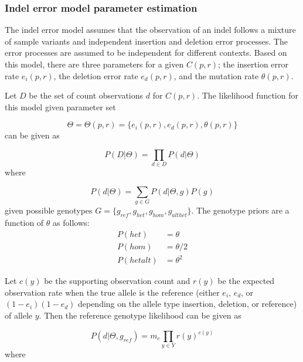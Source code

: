 \documentclass{article}
\begin{document}
\subsubsection{Indel error model parameter estimation}
The indel error model assumes that the observation of an indel follows a mixture of sample variants and independent insertion and deletion error processes. The error processes are assumed to be independent for different contexts. Based on this model, there are three parameters for a given $C(p,r)$; the insertion error rate $e_i(p,r)$, the deletion error rate $e_d(p,r)$, and the mutation rate $\theta(p,r)$.

Let $D$ be the set of count observations $d$ for $C(p,r)$. The likelihood function for this model given parameter set

\begin{equation*}
\Theta=\Theta(p,r)=\{e_i(p,r),e_d(p,r),\theta(p,r)\}
\end{equation*}
can be given as

\begin{equation*}
P(D \vert \Theta)=\prod_{d\in D}P(d \vert \Theta)
\end{equation*}
where

\begin{equation*}
P(d \vert \Theta)=\sum_{g\in G}P(d \vert \Theta,g)P(g)
\end{equation*}
 given possible genotypes $G=\{g_{ref},g_{het},g_{hom},g_{althet}\}$. The genotype priors are a function of $\theta$ as follows:
\begin{equation*}
\begin{aligned}
P(het)&=\theta \\
P(hom)&=\theta/2 \\
P(hetalt)&=\theta^2
\end{aligned}
\end{equation*}


Let $c(y)$ be the supporting observation count and $r(y)$ be the expected observation rate when the true allele is the reference (either $e_i$, $e_d$, or $(1-e_i)(1-e_d)$ depending on the allele type insertion, deletion, or reference) of allele $y$. Then the reference genotype likelihood can be given as

\begin{equation*}
P(d \vert \Theta,g_{ref})=m_c \prod_{y \in Y}r(y)^{c(y)}
\end{equation*}
where
\end{document}
